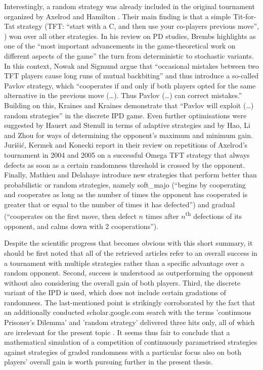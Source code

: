 \documentclass[11pt]{article}
\begin{document}
Interestingly, a random strategy was already included in the original tournament organized by Axelrod and Hamilton \cite{AH81}.
Their main finding is that a simple Tit-for-Tat strategy (TFT: “start with a C, and then use your co-players previous move”, \cite{NS93}) won over all other strategies.
In his review on PD studies, Brembs \cite[p.~14]{Bre96} highlights as one of the “most important advancements in the game-theoretical work on different aspects of the game” the turn from deterministic to stochastic variants.
In this context, Nowak and Sigmund \cite[p.~56]{NS93} argue that “occasional mistakes between two TFT players cause long runs of mutual backbiting” and thus introduce a so-called Pavlov strategy, which “cooperates if and only if both players opted for the same alternative in the previous move (…). Thus Pavlov (…) can correct mistakes.” 
Building on this, Kraines and Kraines \cite[p.~112]{KK93} demonstrate that “Pavlov will exploit (…) random strategies” in the discrete IPD game.
Even further optimisations were suggested by Hauert and Stenull \cite{HS02} in terms of adaptive strategies and by Hao, Li and Zhou \cite{HLZ18} for ways of determining the opponent’s maximum and minimum gain.
Jurišić, Kermek and Konecki \cite{JKK12} report in their review on repetitions of Axelrod’s tournament in 2004 and 2005 on a successful Omega TFT strategy that always defects as soon as a certain randomness threshold is crossed by the opponent. 
Finally, Mathieu and Delahaye \cite[pp.~4, 5]{MD17} introduce new strategies that perform better than probabilistic or random strategies, namely soft\_majo (“begins by cooperating and cooperates as long as the number of times the opponent has cooperated is greater that or equal to the number of times it has defected”) and gradual (“cooperates on the first move, then defect $n$ times after $n$\textsuperscript{th} defections of its opponent, and calms down with 2 cooperations”).

Despite the scientific progress that becomes obvious with this short summary, it should be first noted that all of the retrieved articles refer to an overall success in a tournament with multiple strategies rather than a specific advantage over a random opponent. 
Second, success is understood as outperforming the opponent without also considering the overall gain of both players.
Third, the discrete variant of the IPD is used, which does not include certain gradations of randomness. 
The last-mentioned point is strikingly corroborated by the fact that an additionally conducted scholar.google.com search with the terms 'continuous Prisoner's Dilemma' and 'random strategy' delivered three hits only, all of which are irrelevant for the present topic \cite{Ash08, HLD13, Lei11}. 
It seems thus fair to conclude that a mathematical simulation of a competition of continuously parametrised strategies against strategies of graded randomness with a particular focus also on both players’ overall gain is worth pursuing further in the present thesis. 
\end{document}
